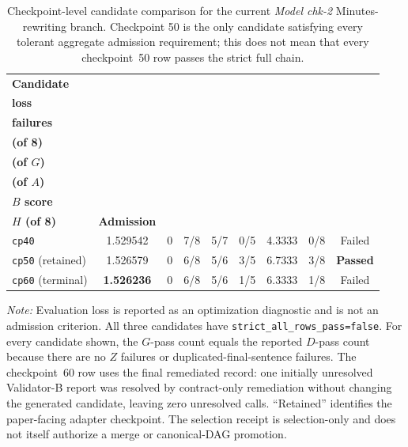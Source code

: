 \begin{table}[htbp]
    \centering
    \scriptsize
    \setlength{\tabcolsep}{2.3pt}
    \renewcommand{\arraystretch}{1.15}
    \begin{tabularx}{\textwidth}{@{}>{\raggedright\arraybackslash}Xcccccccc@{}}
        \toprule
        \textbf{Candidate} &
        \makecell{\textbf{Evaluation}\\\textbf{loss}} &
        \makecell{\textbf{\(Z\)}\\\textbf{failures}} &
        \makecell{\textbf{\(D\) pass}\\\textbf{(of 8)}} &
        \makecell{\textbf{\(A\) pass}\\\textbf{(of \(G\))}} &
        \makecell{\textbf{\(B\) pass}\\\textbf{(of \(A\))}} &
        \makecell{\textbf{Mean}\\\textbf{\(B\) score}} &
        \makecell{\textbf{Full chain}\\\textbf{\(H\) (of 8)}} &
        \textbf{Admission} \\
        \midrule
        \texttt{cp40} & 1.529542 & 0 & 7/8 & 5/7 & 0/5 & 4.3333 & 0/8 & Failed \\
        \texttt{cp50} (retained) & 1.526579 & 0 & 6/8 & 5/6 & 3/5 & 6.7333 & 3/8 & \textbf{Passed} \\
        \texttt{cp60} (terminal) & \textbf{1.526236} & 0 & 6/8 & 5/6 & 1/5 & 6.3333 & 1/8 & Failed \\
        \bottomrule
    \end{tabularx}
    \begin{minipage}{0.97\textwidth}
        \vspace{2pt}
        \footnotesize
        \textit{Note:} Evaluation loss is reported as an optimization
        diagnostic and is not an admission criterion. All three candidates have
        \texttt{strict\_all\_rows\_pass=false}. For every candidate shown,
        the \(G\)-pass count equals the reported \(D\)-pass count because there
        are no \(Z\) failures or duplicated-final-sentence failures. The
        checkpoint~60 row uses the
        final remediated record: one initially unresolved Validator-B report was
        resolved by contract-only remediation without changing the generated
        candidate, leaving zero unresolved calls. ``Retained'' identifies the
        paper-facing adapter checkpoint. The selection receipt is selection-only
        and does not itself authorize a merge or canonical-DAG promotion.
    \end{minipage}
    \caption{Checkpoint-level candidate comparison for the current
    \textit{Model chk-2} Minutes-rewriting branch. Checkpoint 50 is the only
    candidate satisfying every tolerant aggregate admission requirement; this
    does not mean that every checkpoint~50 row passes the strict full chain.}
    \label{tab:app:chk2_cp40_cp60_selection}
\end{table}

